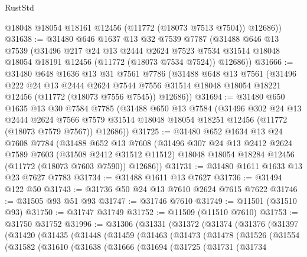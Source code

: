 \begin{lexlean}{RustStd}
\begin{coremodule}
        @18048
        @18054
        @18161
        @12456
        (@11772 (@18073 @7513 @7504))
        @12686))
@31638 := @31480
    @646
    @1637
    @13
    @32
    @7539
    @7787
    (@31488
      @646
      @13
      @7539
      (@31496
        @217
        @24
        @13
        @2444
        @2624
        @7523
        @7534
        @31514
        @18048
        @18054
        @18191
        @12456
        (@11772 (@18073 @7534 @7524))
        @12686))
@31666 := @31480
    @648
    @1636
    @13
    @31
    @7561
    @7786
    (@31488
      @648
      @13
      @7561
      (@31496
        @222
        @24
        @13
        @2444
        @2624
        @7544
        @7556
        @31514
        @18048
        @18054
        @18221
        @12456
        (@11772 (@18073 @7556 @7545))
        @12686))
@31694 := @31480
    @650
    @1635
    @13
    @30
    @7584
    @7785
    (@31488
      @650
      @13
      @7584
      (@31496
        @302
        @24
        @13
        @2444
        @2624
        @7566
        @7579
        @31514
        @18048
        @18054
        @18251
        @12456
        (@11772 (@18073 @7579 @7567))
        @12686))
@31725 := @31480
    @652
    @1634
    @13
    @24
    @7608
    @7784
    (@31488
      @652
      @13
      @7608
      (@31496
        @307
        @24
        @13
        @2412
        @2624
        @7589
        @7603
        (@31508 @2412 @31512 @11512)
        @18048
        @18054
        @18284
        @12456
        (@11772 (@18073 @7603 @7590))
        @12686))
@31731 := @31480 @1611 @1633 @13 @23 @7627 @7783
@31734 := @31488 @1611 @13 @7627
@31736 := @31494 @122 @50
@31743 := @31736 @50 @24 @13 @7610 @2624 @7615 @7622
@31746 := @31505 @93 @51 @93
@31747 := @31746 @7610
@31749 := @11501 (@31510 @93)
@31750 := @31747 @31749
@31752 := @11509 (@11510 @7610)
@31753 := @31750 @31752
@31996 := @31306
    (@31331
      (@31372
        (@31374
          (@31376
            (@31397
              (@31420
                (@31435
                  (@31448
                    (@31459
                      (@31463
                        (@31473
                          (@31478
                            (@31526
                              (@31554
                                (@31582
                                  (@31610
                                    (@31638
                                      (@31666
                                        (@31694
                                          (@31725
                                            (@31731
                                              (@31734

\end{coremodule}
\end{lexlean}
